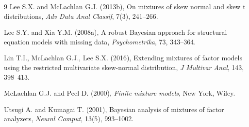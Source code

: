 \documentclass[twoside]{article}
\theoremstyle{definition}
\begin{document}
\begin{thebibliography}{9}
Lee S.X. and McLachlan G.J. (2013b), On mixtures of skew normal and skew t distributions, {\it Adv Data Anal Classif}, 7(3), 241–266.

Lee S.Y. and Xia Y.M. (2008a), A robust Bayesian approach for structural equation models with missing data, {\it Psychometrika}, 73, 343–364.

Lin T.I., McLachlan G.J., Lee S.X. (2016), Extending mixtures of factor models using the restricted multivariate skew-normal distribution, {\it J Multivar Anal}, 143, 398–413.

McLachlan G.J. and Peel D. (2000), {\it Finite mixture models}, New York, Wiley.

Utsugi A. and Kumagai T. (2001), Bayesian analysis of mixtures of factor analyzers, {\it Neural Comput}, 13(5), 993–1002.



\end{thebibliography}
 
\end{document}
